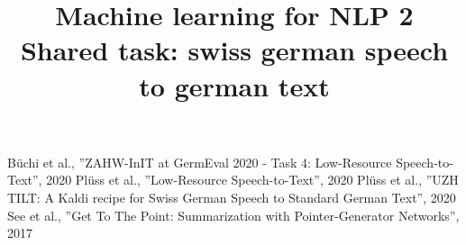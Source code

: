 \documentclass[9pt,conference,final,letterpaper,onecolumn]{IEEEtran}
\begin{document}
\title{\vspace*{2ex}Machine learning for NLP 2\\ \footnotesize Shared task: swiss german speech to german text}

\author{
}
\maketitle

%
%

%
%

\begin{thebibliography}{00}
 Büchi et al., ''ZAHW-InIT at GermEval 2020 - Task 4: Low-Resource Speech-to-Text'', 2020
 Plüss et al., ''Low-Resource Speech-to-Text'', 2020
 Plüss et al., ''UZH TILT: A Kaldi recipe for Swiss German Speech to Standard German Text'', 2020
 See et al., ''Get To The Point: Summarization with Pointer-Generator Networks'', 2017
\end{thebibliography}
\end{document}
